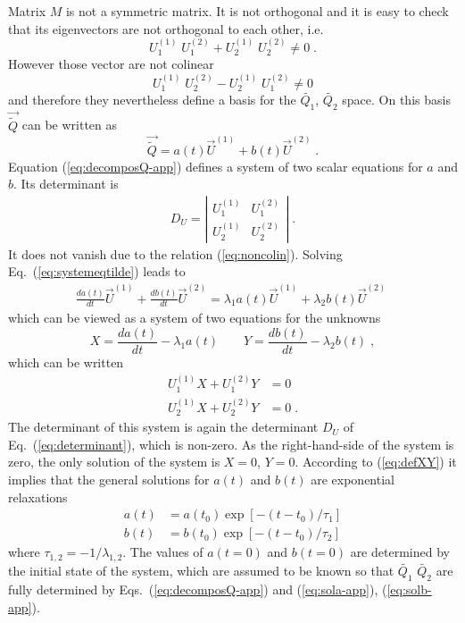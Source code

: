 \documentclass[pre,a4paper,twocolumn,superscriptaddress,%
floatfix]{revtex4}
\begin{document}
Matrix $M$ is not a symmetric matrix. It is not orthogonal and it is easy to
check that its eigenvectors are not orthogonal to each other, i.e.
\begin{equation}
  \label{eq:nonortho}
  U_1^{(1)} \; U_1^{(2)} + U_2^{(1)} \; U_2^{(2)} \not= 0 \; .
\end{equation}
However those vector are not colinear
\begin{equation}
  \label{eq:noncolin}
  U_1^{(1)} \; U_2^{(2)} - U_2^{(1)} \; U_1^{(2)} \not= 0
\end{equation}
and therefore they nevertheless define a basis for the $\widetilde{Q_1}$,
$\widetilde{Q_2}$ space.  On
this basis $\vec{\widetilde{Q}}$ can be written as
  \begin{equation}
    \label{eq:decomposQ-app}
    \vec{\widetilde{Q}} = a(t) \vec{U}^{(1)} + b(t) \vec{U}^{(2)} \; .
  \end{equation}
Equation  (\ref{eq:decomposQ-app})  defines a system of two scalar equations for
$a$ and $b$. Its determinant is
\begin{align}
  \label{eq:determinant}
  D_U = \left| \begin{array}{cc} U_1^{(1)} & U_1^{(2)} \\
                               U_2^{(1)} & U_2^{(2)}
                      \end{array} \right| \; .
\end{align}
It does not vanish due to the relation (\ref{eq:noncolin}).
Solving 
Eq.~(\ref{eq:systemeqtilde}) leads to
\begin{align}
  \label{eq:systemab}
  \frac {da(t)}{dt} \vec{U}^{(1)} + \frac{db(t)}{dt} \vec{U}^{(2)}
  = \lambda_1 a(t) \vec{U}^{(1)} + \lambda_2 b(t) \vec{U}^{(2)} \;
\end{align}
which can be viewed as a system of two equations for the unknowns
\begin{equation}
  \label{eq:defXY}
  X = \frac {da(t)}{dt} - \lambda_1 a(t)
  \qquad Y = \frac {db(t)}{dt} - \lambda_2 b(t) \; ,
\end{equation}
which can be written
\begin{align}
  \label{eq:systemeXY}
  U_1^{(1)} X + U_1^{(2)} Y &= 0 \nonumber \\
  U_2^{(1)} X + U_2^{(2)} Y &= 0  \; .
\end{align}
The determinant of this system is again the determinant $D_U$ of
Eq.~(\ref{eq:determinant}), which is non-zero. As the right-hand-side of the
system is zero, the only solution of the system is $X=0$, $Y=0$. According to
(\ref{eq:defXY}) it implies that the general solutions for $a(t)$ and $b(t)$
are exponential relaxations
\begin{align}
  \label{eq:sola-app}
  a(t) &= a(t_0) \exp[ - (t-t_0) / \tau_1] \\
  \label{eq:solb-app}
  b(t) &= b(t_0) \exp[ - (t-t_0) / \tau_2]
\end{align}
where
$\tau_{1,2} = -1/\lambda_{1,2}$. The values of $a(t=0)$ and $b(t=0)$ are
determined by the initial state of the system, which are assumed to be known
so that $\widetilde{Q_1}$ $\widetilde{Q_2}$ are fully determined by
Eqs.~(\ref{eq:decomposQ-app}) and (\ref{eq:sola-app}), (\ref{eq:solb-app}).
\end{document}
